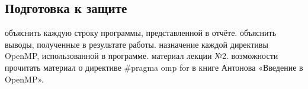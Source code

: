 { %
	\subsection{Подготовка к защите}
	\begin{enumerate}
		 объяснить каждую строку программы, представленной в отчёте.
		 объяснить выводы, полученные в результате работы.
		 назначение каждой директивы OpenMP, использованной в программе.
		 материал лекции №2.
		 возможности прочитать материал о директиве \#pragma omp for в книге Антонова «Введение в OpenMP».
	\end{enumerate}
}